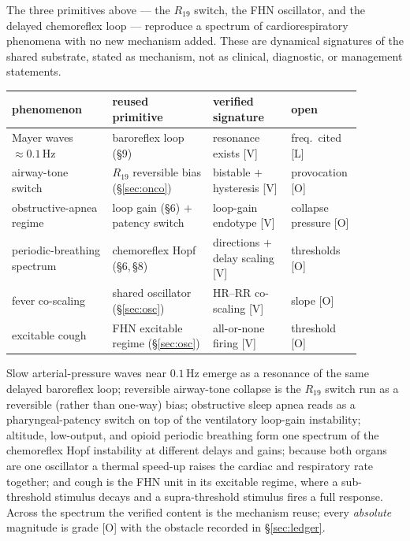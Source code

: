 \documentclass[11pt]{article}
\newcommand{\grade}[1]{\textsf{\small[#1]}}
\begin{document}
The three primitives above --- the $R_{19}$ switch, the FHN oscillator, and the delayed chemoreflex
loop --- reproduce a spectrum of cardiorespiratory phenomena with no new mechanism added. These are
dynamical signatures of the shared substrate, stated as mechanism, not as clinical, diagnostic, or
management statements.

\begin{center}
\begin{tabular}{@{}p{0.27\linewidth}p{0.27\linewidth}p{0.21\linewidth}p{0.13\linewidth}@{}}
\toprule
phenomenon & reused primitive & verified signature & open\\
\midrule
Mayer waves $\approx 0.1\,$Hz & baroreflex loop (\S9) & resonance exists \grade{V} & freq.\ cited \grade{L}\\
airway-tone switch & $R_{19}$ reversible bias (\S\ref{sec:onco}) & bistable $+$ hysteresis \grade{V} & provocation \grade{O}\\
obstructive-apnea regime & loop gain (\S6) $+$ patency switch & loop-gain endotype \grade{V} & collapse pressure \grade{O}\\
periodic-breathing spectrum & chemoreflex Hopf (\S6,\,\S8) & directions $+$ delay scaling \grade{V} & thresholds \grade{O}\\
fever co-scaling & shared oscillator (\S\ref{sec:osc}) & HR--RR co-scaling \grade{V} & slope \grade{O}\\
excitable cough & FHN excitable regime (\S\ref{sec:osc}) & all-or-none firing \grade{V} & threshold \grade{O}\\
\bottomrule
\end{tabular}
\end{center}

\noindent
Slow arterial-pressure waves near $0.1\,$Hz emerge as a resonance of the same delayed baroreflex loop;
reversible airway-tone collapse is the $R_{19}$ switch run as a reversible (rather than one-way) bias;
obstructive sleep apnea reads as a pharyngeal-patency switch on top of the ventilatory loop-gain
instability; altitude, low-output, and opioid periodic breathing form one spectrum of the chemoreflex
Hopf instability at different delays and gains; because both organs are one oscillator a thermal
speed-up raises the cardiac and respiratory rate together; and cough is the FHN unit in its excitable
regime, where a sub-threshold stimulus decays and a supra-threshold stimulus fires a full response.
Across the spectrum the verified content is the mechanism reuse; every \emph{absolute} magnitude is
grade \grade{O} with the obstacle recorded in \S\ref{sec:ledger}.
\end{document}
